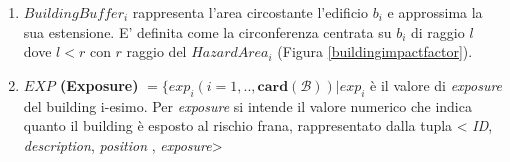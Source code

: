 \begin{enumerate}
	\item \textit{$BuildingBuffer_i$} rappresenta l'area circostante l'edificio $b_i$ e approssima la sua estensione. E' definita come la circonferenza centrata su $b_i$ di raggio $l$ dove $l < r $ con $r$ raggio del \textit{$HazardArea_i$} (Figura \ref{buildingimpactfactor}).
	
	\item \label{last_enum} \textbf{$EXP$ (Exposure)} $ = \{exp_i(i=1,..,\mathbf{card}(\mathcal{B})) | exp_i $ è il valore di \textit{exposure} del building i-esimo. Per \textit{exposure} si intende il valore numerico che indica quanto il building è esposto al rischio frana, 
	rappresentato dalla tupla < \textit{ID}, \textit{description}, \textit{position} , \textit{exposure}> 
	
\end{enumerate}
